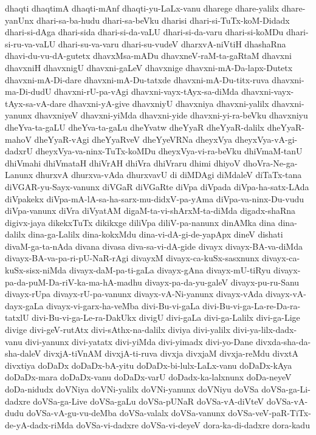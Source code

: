 {dhaqti
dhaqtimA
dhaqti-mAnf
dhaqti-yu-LaLx-vanu
dharege
dhare-yalilx
dhare-yanUnx
dhari-sa-ba-hudu
dhari-sa-beVku
dharisi
dhari-si-TuTx-koM-Didadx
dhari-si-dAga
dhari-sida
dhari-si-da-vaLU
dhari-si-da-varu
dhari-si-koMDu
dhari-si-ru-va-vaLU
dhari-su-va-varu
dhari-su-vudeV
dharxvA-niVtiH
dhashaRna
dhavi-du-vu-dA-gutetx
dhavxMsa-mADu
dhavxneV-raM-ta-gaRtaM
dhavxni
dhavxniH
dhavxnigU
dhavxni-gaLeV
dhavxnige
dhavxni-mA-Da-lapx-Dutetx
dhavxni-mA-Di-dare
dhavxni-mA-Du-tatxde
dhavxni-mA-Du-titx-ruva
dhavxni-ma-Di-dudU
dhavxni-rU-pa-vAgi
dhavxni-vayx-tAyx-sa-diMda
dhavxni-vayx-tAyx-sa-vA-dare
dhavxni-yA-give
dhavxniyU
dhavxniya
dhavxni-yalilx
dhavxni-yanunx
dhavxniyeV
dhavxni-yiMda
dhavxni-yide
dhavxni-yi-ra-beVku
dhavxniyu
dheYva-ta-gaLU
dheYva-ta-gaLu
dheYvatw
dheYyaR
dheYyaR-dalilx
dheYyaR-mahoV
dheYyaR-vAgi
dheYyaRveV
dheYyeVRNa
dheyxVya
dheyxVya-vA-gi-dadxrU
dheyxVya-va-ninx-TuTx-koMDu
dheyxVya-vi-ra-beVku
dhiVmaM-tanU
dhiVmahi
dhiVmataH
dhiVrAH
dhiVra
dhiVraru
dhimi
dhiyoV
dhoVra-Ne-ga-Lanunx
dhurxvA
dhurxva-vAda
dhurxvavU
di
diMDAgi
diMdaleV
diTaTx-tana
diVGAR-yu-Sayx-vanunx
diVGaR
diVGaRte
diVpa
diVpada
diVpa-ha-satx-LAda
diVpakekx
diVpa-mA-lA-sa-ha-sarx-mu-didxV-pa-yAma
diVpa-va-ninx-Du-vudu
diVpa-vanunx
diVra
diVyatAM
digaM-ta-vi-shArxM-ta-diMda
digadx-shaRna
digivx-jaya
dikekxTuTx
dikikxge
diliVpa
diliV-pa-nanunx
dinAMka
dina
dina-dalilx
dina-ga-Lalilx
dina-kokxMdu
dina-vi-dA-gi-de-yapApx
dineV
dishati
divaM-ga-ta-nAda
divana
divasa
diva-sa-vi-dA-gide
divayx
divayx-BA-va-diMda
divayx-BA-va-pa-ri-pU-NaR-rAgi
divayxM
divayx-ca-kuSx-sasxnunx
divayx-ca-kuSx-sisx-niMda
divayx-daM-pa-ti-gaLa
divayx-gAna
divayx-mU-tiRyu
divayx-pa-da-puM-Da-riV-ka-ma-hA-madhu
divayx-pa-da-yu-galeV
divayx-pu-ru-Sanu
divayx-rUpa
divayx-rU-pa-vanunx
divayx-vA-Ni-yanunx
divayx-vAda
divayx-vA-dayx-gaLa
divayx-vi-garx-ha-veMba
divi-Bu-vi-gaLa
divi-Bu-vi-ga-La-re-Da-ra-tatxlU
divi-Bu-vi-ga-Le-ra-DakUkx
divigU
divi-gaLa
divi-ga-Lalilx
divi-ga-Lige
divige
divi-geV-rutAtx
divi-sAthx-na-dalilx
diviya
divi-yalilx
divi-ya-lilx-dadx-vanu
divi-yanunx
divi-yatatx
divi-yiMda
divi-yimadx
divi-yo-Dane
divxda-sha-da-sha-daleV
divxjA-tiVnAM
divxjA-ti-ruva
divxja
divxjaM
divxja-reMdu
divxtA
divxtiya
doDaDx
doDaDx-bA-yitu
doDaDx-bi-lulx-LaLx-vanu
doDaDx-kAya
doDaDx-mara
doDaDx-vanu
doDaDx-varU
doDadx-ka-lalxnunx
doDa-neyeV
doDa-nidudx
doVNiya
doVNi-yalilx
doVNi-yanunx
doVNiyu
doVSa
doVSa-ga-Li-dadxre
doVSa-ga-Live
doVSa-gaLu
doVSa-pUNaR
doVSa-vA-diVteV
doVSa-vA-dudu
doVSa-vA-gu-vu-deMba
doVSa-valalx
doVSa-vanunx
doVSa-veV-paR-TiTx-de-yA-dadx-riMda
doVSa-vi-dadxre
doVSa-vi-deyeV
dora-ka-di-dadxre
dora-kadu
}
